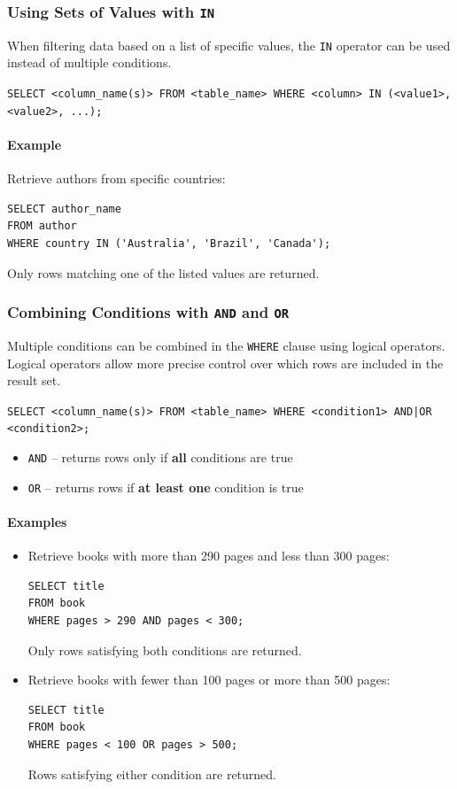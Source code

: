 \documentclass{article}
\begin{document}
\subsubsection{Using Sets of Values with \texttt{IN}}
When filtering data based on a list of specific values, the \texttt{IN} operator can be used instead of multiple conditions.

\begin{FormulaBox}
\texttt{SELECT <column\_name(s)> FROM <table\_name> WHERE <column> IN (<value1>, <value2>, ...);}
\end{FormulaBox}

\paragraph{Example}
Retrieve authors from specific countries:
\begin{verbatim}
SELECT author_name
FROM author
WHERE country IN ('Australia', 'Brazil', 'Canada');
\end{verbatim}
Only rows matching one of the listed values are returned.

\subsubsection{Combining Conditions with \texttt{AND} and \texttt{OR}}

Multiple conditions can be combined in the \texttt{WHERE} clause using logical operators.  
Logical operators allow more precise control over which rows are included in the result set.

\begin{FormulaBox}
\texttt{SELECT <column\_name(s)> FROM <table\_name> WHERE <condition1> AND|OR <condition2>;}
\end{FormulaBox}

\begin{itemize}
    \item \texttt{AND} – returns rows only if \textbf{all} conditions are true
    \item \texttt{OR} – returns rows if \textbf{at least one} condition is true
\end{itemize}

\paragraph{Examples}
\begin{itemize}
    \item Retrieve books with more than 290 pages and less than 300 pages:
\begin{verbatim}
SELECT title
FROM book
WHERE pages > 290 AND pages < 300;
\end{verbatim}
Only rows satisfying both conditions are returned.

    \item Retrieve books with fewer than 100 pages or more than 500 pages:
\begin{verbatim}
SELECT title
FROM book
WHERE pages < 100 OR pages > 500;
\end{verbatim}
Rows satisfying either condition are returned.
\end{itemize}
\end{document}
